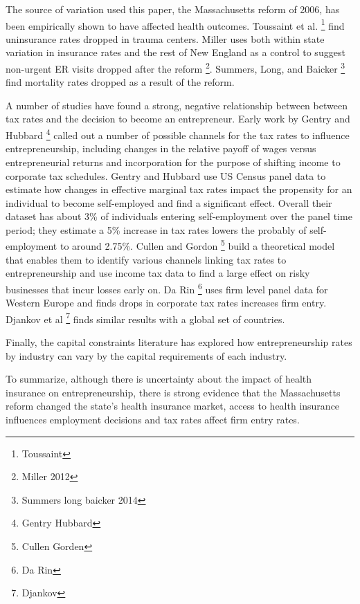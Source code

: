 \documentclass[12pt]{article}
\begin{document}
The source of variation used this paper, the Massachusetts reform of 2006, has been empirically shown to have affected health outcomes. Toussaint et al. \footnote{Toussaint} find uninsurance rates dropped in trauma centers. Miller uses both within state variation in insurance rates and the rest of New England as a control to suggest non-urgent ER visits dropped after the reform \footnote{Miller 2012}.  Summers, Long, and Baicker \footnote{Summers long baicker 2014} find mortality rates dropped as a result of the reform. 

A number of studies have found a strong, negative relationship between between tax rates and the decision to become an entrepreneur. Early work by Gentry and Hubbard \footnote{Gentry Hubbard} called out a number of possible channels for the tax rates to influence entrepreneurship, including changes in the relative payoff of wages versus entrepreneurial returns and incorporation for the purpose of shifting income to corporate tax schedules. Gentry and Hubbard use US Census panel data to estimate how changes in effective marginal tax rates impact the propensity for an individual to become self-employed and find a significant effect. Overall their dataset has about 3\% of individuals entering self-employment over the panel time period; they estimate a 5\% increase in tax rates lowers the probably of self-employment to around 2.75\%. Cullen and Gordon \footnote{Cullen Gorden} build a theoretical model that enables them to identify various channels linking tax rates to entrepreneurship and use income tax data to find a large effect on risky businesses that incur losses early on. Da Rin \footnote{Da Rin} uses firm level panel data for Western Europe and finds drops in corporate tax rates increases firm entry. Djankov et al \footnote{Djankov} finds similar results with a global set of countries. 

Finally, the capital constraints literature has explored how entrepreneurship rates by industry can vary by the capital requirements of each industry. 

\begin{comment}

The taxation literature has also explored how
workers might value benefits that are funded by taxes, see Gruber [9]. We contribute
by providing a novel setting to test the relationship between expected taxation and
self-employment.

\end{comment}

To summarize, although there is uncertainty about the impact of health insurance on entrepreneurship, there is strong evidence that the Massachusetts reform changed the state's health insurance market, access to health insurance influences employment decisions and tax rates affect firm entry rates.
\end{document}

